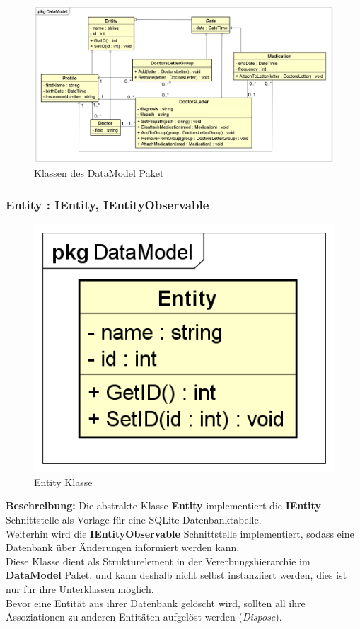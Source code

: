\documentclass[a4paper]{scrreprt}
\begin{document}
\begin{figure}[H]
\centering
\includegraphics[width=0.75\textheight]{graphics/Klassendiagramme/Model/DataModelPackage.png}
\caption{Klassen des DataModel Paket}
\end{figure}
\subsubsection{Entity : IEntity, IEntityObservable}
\begin{figure}[H]
\centering
\includegraphics[width=0.75\textheight]{graphics/Klassendiagramme/Model/Entity.png}
\caption{Entity Klasse}
\end{figure}
\textbf{Beschreibung:} Die abstrakte Klasse \textbf{Entity} implementiert die \textbf{IEntity} Schnittstelle als Vorlage für eine SQLite-Datenbanktabelle.\\
Weiterhin wird die \textbf{IEntityObservable} Schnittstelle implementiert, sodass eine Datenbank über Änderungen informiert werden kann.\\
Diese Klasse dient als Strukturelement in der Vererbungshierarchie im \textbf{DataModel} Paket, und kann deshalb nicht selbst instanziiert werden, dies ist nur für ihre Unterklassen möglich.\\
Bevor eine Entität aus ihrer Datenbank gelöscht wird, sollten all ihre Assoziationen zu anderen Entitäten aufgelöst werden (\textit{Dispose}).
\end{document}
